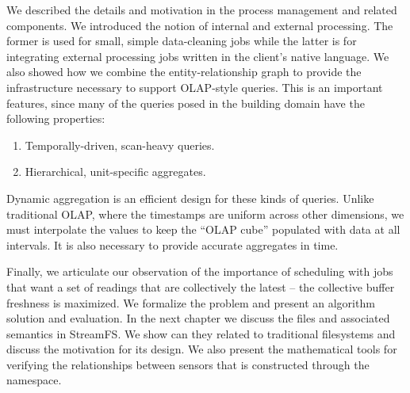 
We described the details and motivation in the process management and related components.  We introduced the 
notion of internal and external processing.  The former is used for small, simple data-cleaning jobs while the latter
is for integrating external processing jobs written in the client's native language.
We also showed how we combine the entity-relationship graph to provide the infrastructure necessary to support OLAP-style queries.
This is an important features, since many of the queries posed in the building domain have the following properties:

\begin{enumerate}
\item Temporally-driven, scan-heavy queries.
\item Hierarchical, unit-specific aggregates.
\end{enumerate}

Dynamic aggregation is an efficient design for these kinds of queries.  Unlike traditional OLAP, where the timestamps
are uniform across other dimensions, we must interpolate the values to keep the ``OLAP cube'' populated with data at all
intervals.  It is also necessary to provide accurate aggregates in time.

Finally, we articulate our observation of the importance of scheduling with jobs that want a set of readings that are collectively
the latest -- the collective buffer freshness is maximized.  We formalize the problem and present an algorithm solution and evaluation.
In the next chapter we discuss the files and associated semantics in StreamFS.  We show can they related to traditional filesystems
and discuss the motivation for its design.  We also present the mathematical tools for verifying the relationships between sensors that
is constructed through the namespace.